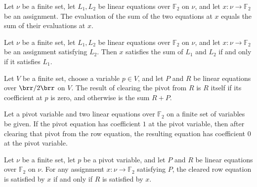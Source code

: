 \begin{theorem}
\leanok
{}
Let $\nu$ be a finite set, let $L_1,L_2$ be linear equations over $\mathbb{F}_2$
on $\nu$, and let $x\colon\nu\to\mathbb{F}_2$ be an assignment. The evaluation of the
sum of the two equations at $x$ equals the sum of their evaluations at $x$.
\end{theorem}

\begin{theorem}
\leanok
{}
Let $\nu$ be a finite set, let $L_1,L_2$ be linear equations over $\mathbb{F}_2$ on
$\nu$, and let $x\colon\nu\to\mathbb{F}_2$ be an assignment satisfying $L_2$. Then $x$
satisfies the sum of $L_1$ and $L_2$ if and only if it satisfies $L_1$.
\end{theorem}

\begin{definition}
\leanok
{}
Let $V$ be a finite set, choose a variable $p\in V$, and let $P$ and $R$ be linear
equations over $\brr/2\brr$ on $V$. The result of clearing the pivot from $R$ is $R$
itself if its coefficient at $p$ is zero, and otherwise is the sum $R+P$.
\end{definition}

\begin{theorem}
\leanok
{}
Let a pivot variable and two linear equations over $\mathbb{F}_2$ on a finite
set of variables be given. If the pivot equation has coefficient $1$ at the pivot
variable, then after clearing that pivot from the row equation, the resulting equation
has coefficient $0$ at the pivot variable.
\end{theorem}

\begin{theorem}
\leanok
{}
Let $\nu$ be a finite set, let $p$ be a pivot variable, and let $P$ and $R$ be linear
equations over $\mathbb{F}_2$ on $\nu$. For any assignment $x\colon\nu\to\mathbb{F}_2$
satisfying $P$, the cleared row equation is satisfied by $x$ if and only if $R$ is
satisfied by $x$.
\end{theorem}

